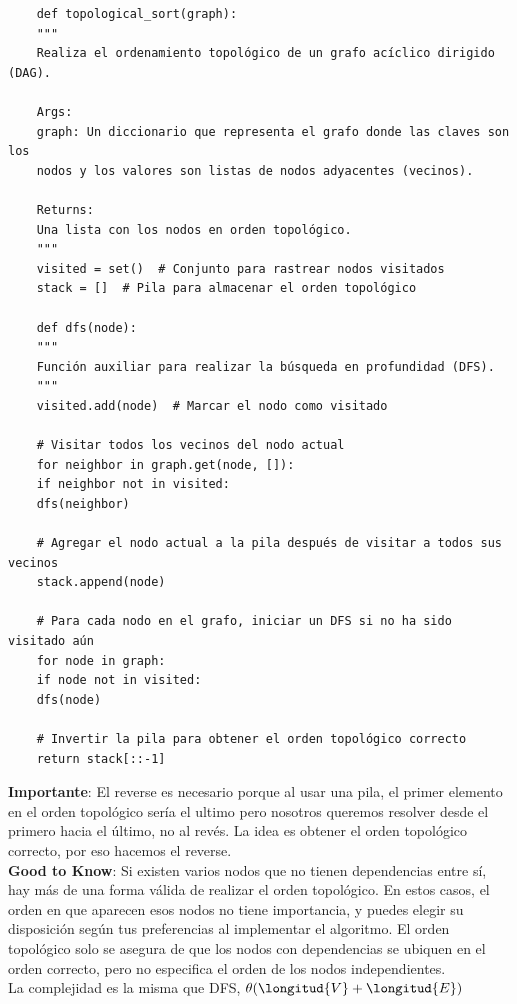 \documentclass[10pt,a4paper]{article}
\begin{document}
\begin{lstlisting}
    def topological_sort(graph):
    """
    Realiza el ordenamiento topológico de un grafo acíclico dirigido (DAG).
  
    Args:
    graph: Un diccionario que representa el grafo donde las claves son los
    nodos y los valores son listas de nodos adyacentes (vecinos).
  
    Returns:
    Una lista con los nodos en orden topológico.
    """
    visited = set()  # Conjunto para rastrear nodos visitados
    stack = []  # Pila para almacenar el orden topológico
  
    def dfs(node):
    """
    Función auxiliar para realizar la búsqueda en profundidad (DFS).
    """
    visited.add(node)  # Marcar el nodo como visitado
  
    # Visitar todos los vecinos del nodo actual
    for neighbor in graph.get(node, []):
    if neighbor not in visited:
    dfs(neighbor)
  
    # Agregar el nodo actual a la pila después de visitar a todos sus vecinos
    stack.append(node)
  
    # Para cada nodo en el grafo, iniciar un DFS si no ha sido visitado aún
    for node in graph:
    if node not in visited:
    dfs(node)
  
    # Invertir la pila para obtener el orden topológico correcto
    return stack[::-1]
\end{lstlisting}
\textbf{Importante}: El reverse es necesario porque al usar una pila, el primer elemento en el orden topológico sería el ultimo pero nosotros queremos resolver desde el primero hacia el último, no al revés. La idea es obtener el orden topológico correcto, por eso hacemos el reverse. \\
\textbf{Good to Know}: Si existen varios nodos que no tienen dependencias entre sí, hay más de una forma válida de realizar el orden topológico. En estos casos, el orden en que aparecen esos nodos no tiene importancia, y puedes elegir su disposición según tus preferencias al implementar el algoritmo. El orden topológico solo se asegura de que los nodos con dependencias se ubiquen en el orden correcto, pero no especifica el orden de los nodos independientes. \\
La complejidad es la misma que DFS, $\theta(\longitud{V} + \longitud{E})$
\end{document}

